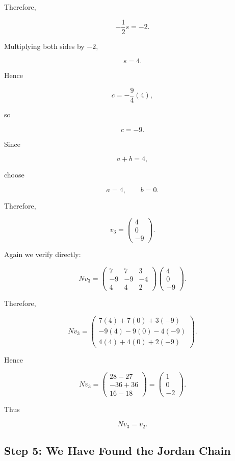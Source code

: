 \documentclass[11pt]{article}
\begin{document}
Therefore,

\[
-\frac12s=-2.
\]

Multiplying both sides by \(-2\),

\[
s=4.
\]

Hence

\[
c=-\frac94(4),
\]

so

\[
c=-9.
\]

Since

\[
a+b=4,
\]

choose

\[
a=4,
\qquad
b=0.
\]

Therefore,

\[
\boxed{
v_3=
\begin{pmatrix}
4\\
0\\
-9
\end{pmatrix}.
}
\]

Again we verify directly:

\[
Nv_3
=
\begin{pmatrix}
7&7&3\\
-9&-9&-4\\
4&4&2
\end{pmatrix}
\begin{pmatrix}
4\\
0\\
-9
\end{pmatrix}.
\]

Therefore,

\[
Nv_3
=
\begin{pmatrix}
7(4)+7(0)+3(-9)\\
-9(4)-9(0)-4(-9)\\
4(4)+4(0)+2(-9)
\end{pmatrix}.
\]

Hence

\[
Nv_3
=
\begin{pmatrix}
28-27\\
-36+36\\
16-18
\end{pmatrix}
=
\begin{pmatrix}
1\\
0\\
-2
\end{pmatrix}.
\]

Thus

\[
\boxed{
Nv_3=v_2.
}
\]


\subsection{Step 5: We Have Found the Jordan Chain}
\end{document}
